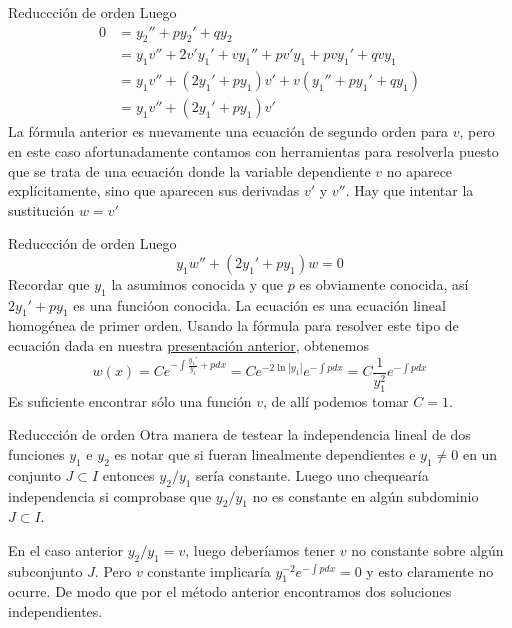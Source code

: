 \documentclass[handout,hyperref={colorlinks=true}]{beamer}
\newcommand{\nl}{\onslide<+-> }
\begin{document}
\begin{frame}{Reduccción de orden}
Luego
\[
 \begin{split}
    0&=y_2''+py_2'+qy_2\\
    &=y_1v''+2v'y_1'+vy_1''+pv'y_1+pvy_1'+qvy_1\\
    &=y_1 v''+(2y_1'+py_1)v'+v(y_1''+py_1'+qy_1)\\
    &=y_1 v''+(2y_1'+py_1)v'
 \end{split}
\]
La fórmula anterior es nuevamente una ecuación de segundo orden para $v$, 
pero en este caso afortunadamente contamos con herramientas para resolverla puesto que se trata de una ecuación donde la 
variable dependiente $v$ no aparece explícitamente, sino que aparecen sus derivadas $v'$ y $v''$. Hay que intentar la sustitución $w=v'$


\end{frame}
 
 
\begin{frame}{Reduccción de orden}
Luego
\[
 y_1w''+(2y_1'+py_1)w=0
\]
Recordar que $y_1$ la asumimos conocida y que $p$ es obviamente conocida, así $2y_1'+py_1$ es una funcióon conocida. La ecuación es una ecuación lineal homogénea de primer orden. 
Usando la fórmula para resolver este tipo de ecuación dada en nuestra 
\href{https://github.com/fdmazzone/Material-Ecuaciones-Diferenciales/blob/master/uni2.pdf?raw=true}{presentación anterior}, obtenemos
\[w(x)=Ce^{-\int \frac{y_1'}{y_1}+p dx}=Ce^{-2\ln|y_1|}e^{-\int p dx}=C\frac{1}{y_1^2}e^{-\int p dx} \]
Es suficiente encontrar sólo una función $v$, de allí podemos tomar $C=1$. 



\end{frame} 

\begin{frame}{Reduccción de orden}
\nl Otra manera de testear la independencia lineal de dos funciones $y_1$ e $y_2$ es notar que si fueran linealmente dependientes e $y_1\neq 0$ 
en un conjunto $J\subset I$ entonces $y_2/y_1$
sería constante.  
\nl Luego uno chequearía independencia si comprobase que $y_2/y_1$ no es constante en algún subdominio $J\subset I$. 

\nl En el caso anterior $y_2/y_1=v$, luego 
deberíamos tener $v$ no constante sobre algún subconjunto $J$. Pero $v$ constante implicaría $y_1^{-2}e^{-\int pdx}=0$ y esto claramente no ocurre. De modo que por el
método anterior encontramos dos soluciones independientes.   





\end{frame} 
\end{document}
